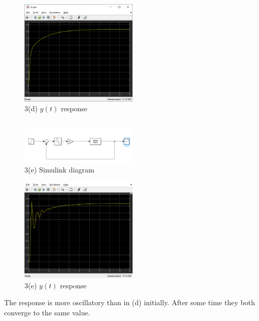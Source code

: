 \begin{figure}[h]
    \centering
    \includegraphics[width=0.5\textwidth]{Questions/Figures/Q3dScope.png}
    \caption{3(d) $y(t)$ response}
\end{figure}
\FloatBarrier
\subsection{}
\begin{figure}[h]
    \centering
    \includegraphics[width=0.5\textwidth]{Questions/Figures/Q3eSimulink.png}
    \caption{3(e) Simulink diagram}
\end{figure}
\begin{figure}[h]
    \centering
    \includegraphics[width=0.5\textwidth]{Questions/Figures/Q3eScope.png}
    \caption{3(e) $y(t)$ response}
\end{figure}

The response is more oscillatory than in (d) initially. After some time they both converge to the same value.

\FloatBarrier
